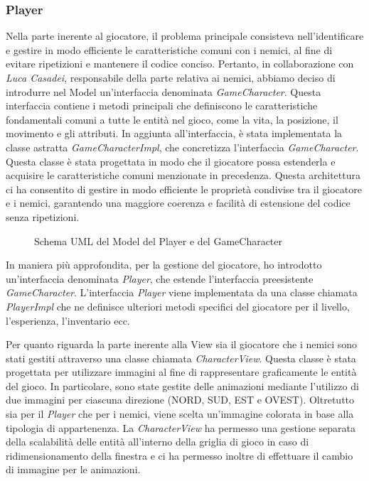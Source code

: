 \documentclass[a4paper,12pt]{report}
\begin{document}
\subsubsection{Player}
Nella parte inerente al giocatore, il problema principale consisteva nell'identificare e gestire in modo efficiente le caratteristiche comuni con i nemici, al fine di evitare ripetizioni e mantenere il codice conciso. 
Pertanto, in collaborazione con \textit{Luca Casadei}, responsabile della parte relativa ai nemici, abbiamo deciso di introdurre nel Model un'interfaccia denominata \textit{GameCharacter}. Questa interfaccia contiene i metodi principali che definiscono le caratteristiche fondamentali comuni a tutte le entità nel gioco, come la vita, la posizione, il movimento e gli attributi.
In aggiunta all'interfaccia, è stata implementata la classe astratta \textit{GameCharacterImpl}, che concretizza l'interfaccia \textit{GameCharacter}. Questa classe è stata progettata in modo che il giocatore possa estenderla e acquisire le caratteristiche comuni menzionate in precedenza. Questa architettura ci ha consentito di gestire in modo efficiente le proprietà condivise tra il giocatore e i nemici, garantendo una maggiore coerenza e facilità di estensione del codice senza ripetizioni.

\begin{figure}[H]
	\centering
	
	\caption{Schema UML del Model del Player e del GameCharacter}
	\label{fig:the-exiled-player-uml}
\end{figure}

In maniera più approfondita, per la gestione del giocatore, ho introdotto un'interfaccia denominata \textit{Player}, che estende l'interfaccia preesistente \textit{GameCharacter}. 
L'interfaccia \textit{Player} viene implementata da una classe chiamata \textit{PlayerImpl} che ne definisce ulteriori metodi specifici del giocatore per il livello, l'esperienza, l'inventario ecc. 

Per quanto riguarda la parte inerente alla View sia il giocatore che i nemici sono stati gestiti attraverso una classe chiamata \textit{CharacterView}. Questa classe è stata progettata per utilizzare immagini al fine di rappresentare graficamente le entità del gioco. In particolare, sono state gestite delle animazioni mediante l'utilizzo di due immagini per ciascuna direzione (NORD, SUD, EST e OVEST). Oltretutto sia per il \textit{Player} che per i nemici, viene scelta un'immagine colorata in base alla tipologia di appartenenza. La \textit{CharacterView} ha permesso una gestione separata della scalabilità delle entità all'interno della griglia di gioco in caso di ridimensionamento della finestra e ci ha permesso inoltre di effettuare il cambio di immagine per le animazioni.
\end{document}
